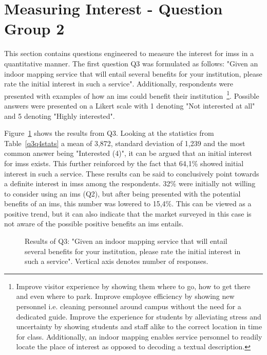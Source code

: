 \section{Measuring Interest - Question Group 2}
This section contains questions engineered to measure the interest for \glspl{ims} in a quantitative manner. The first question Q3 was formulated as follows: "Given an indoor mapping service that will entail several benefits for your institution, please rate the initial interest in such a service". Additionally, respondents were presented with examples of how an \gls{ims} could benefit their institution~\footnote{Improve visitor experience by showing them where to go, how to get there and even where to park. Improve employee efficiency by showing new personnel i.e. cleaning personnel around campus without the need for a dedicated guide. Improve the experience for students by alleviating stress and uncertainty by showing students and staff alike to the correct location in time for class. Additionally, an indoor mapping enables service personnel to readily locate the place of interest as opposed to decoding a textual description.}. Possible answers were presented on a Likert scale with 1 denoting "Not interested at all" and 5 denoting "Highly interested".


Figure~\ref{fig:q3} shows the results from Q3. Looking at the statistics from Table~\ref{q3q4stats} a mean of 3,872, standard deviation of 1,239 and the most common answer being "Interested (4)", it can be argued that an initial interest for \glspl{ims} exists. This further reinforced by the fact that 64,1\% showed initial interest in such a service. These results can be said to conclusively point towards a definite interest in \glspl{ims} among the respondents. 32\% were initially not willing to consider using an \gls{ims} (Q2), but after being presented with the potential benefits of an \gls{ims}, this number was lowered to 15,4\%. This can be viewed as a positive trend, but it can also indicate that the market surveyed in this case is not aware of the possible positive benefits an \gls{ims} entails.


\begin{figure}
    \centering
    \caption{Results of Q3: "Given an indoor mapping service that will entail several benefits for your institution, please rate the initial interest in such a service". Vertical axis denotes number of responses.}
    \label{fig:q3}
\end{figure}



